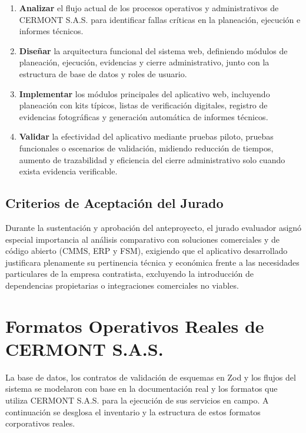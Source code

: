 \begin{enumerate}
    \item \textbf{Analizar} el flujo actual de los procesos operativos y administrativos de CERMONT S.A.S. para identificar fallas críticas en la planeación, ejecución e informes técnicos.
    \item \textbf{Diseñar} la arquitectura funcional del sistema web, definiendo módulos de planeación, ejecución, evidencias y cierre administrativo, junto con la estructura de base de datos y roles de usuario.
    \item \textbf{Implementar} los módulos principales del aplicativo web, incluyendo planeación con kits típicos, listas de verificación digitales, registro de evidencias fotográficas y generación automática de informes técnicos.
    \item \textbf{Validar} la efectividad del aplicativo mediante pruebas piloto, pruebas funcionales o escenarios de validación, midiendo reducción de tiempos, aumento de trazabilidad y eficiencia del cierre administrativo solo cuando exista evidencia verificable.
\end{enumerate}

\section{Criterios de Aceptación del Jurado}
Durante la sustentación y aprobación del anteproyecto, el jurado evaluador asignó especial importancia al análisis comparativo con soluciones comerciales y de código abierto (CMMS, ERP y FSM), exigiendo que el aplicativo desarrollado justificara plenamente su pertinencia técnica y económica frente a las necesidades particulares de la empresa contratista, excluyendo la introducción de dependencias propietarias o integraciones comerciales no viables.

\chapter{Formatos Operativos Reales de CERMONT S.A.S.}
\label{apendice:formatos-cermont}

La base de datos, los contratos de validación de esquemas en Zod y los flujos del sistema se modelaron con base en la documentación real y los formatos que utiliza CERMONT S.A.S. para la ejecución de sus servicios en campo. A continuación se desglosa el inventario y la estructura de estos formatos corporativos reales.

